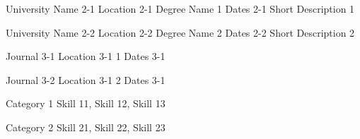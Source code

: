 \begin{cventries}

  \cventryshort
    {University Name 2-1}
    {Location 2-1}
    {Degree Name 1}
    {Dates 2-1}
    {Short Description 1}

  \cventryshort
    {University Name 2-2}
    {Location 2-2}
    {Degree Name 2}
    {Dates 2-2}
    {Short Description 2}

\end{cventries}


\begin{cventries}

  \cventryshort
    {Journal 3-1}
    {Location 3-1}
    { 1}
    {Dates 3-1}

  \cventryshort
    {Journal 3-2}
    {Location 3-1}
    { 2}
    {Dates 3-1}

\end{cventries}


\begin{cvskills}

  \cvskill
    {Category 1}
    {Skill 11, Skill 12, Skill 13}

  \cvskill
    {Category 2}
    {Skill 21, Skill 22, Skill 23}

\end{cvskills}
